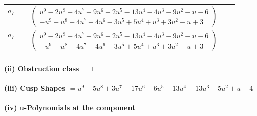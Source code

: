 \documentclass[1p]{elsarticle_modified}
\theoremstyle{definition}
\begin{document}
\begin{tabular}{m{7pt} m{180pt} m{7pt} m{180pt} }
\flushright $a_{7}=$&$\begin{pmatrix}u^9-2 u^8+4 u^7-9 u^6+2 u^5-13 u^4-4 u^3-9 u^2- u-6\\- u^9+u^8-4 u^7+4 u^6-3 u^5+5 u^4+u^3+3 u^2- u+3\end{pmatrix}$\\ \flushright $a_{7}=$&$\begin{pmatrix}u^9-2 u^8+4 u^7-9 u^6+2 u^5-13 u^4-4 u^3-9 u^2- u-6\\- u^9+u^8-4 u^7+4 u^6-3 u^5+5 u^4+u^3+3 u^2- u+3\end{pmatrix}$\\&\end{tabular}
\flushleft \textbf{(ii) Obstruction class $= 1$}\\~\\
\flushleft \textbf{(iii) Cusp Shapes $= u^9-5 u^8+3 u^7-17 u^6-6 u^5-13 u^4-13 u^3-5 u^2+u-4$}\\~\\
\newpage\renewcommand{\arraystretch}{1}
\flushleft \textbf{(iv) u-Polynomials at the component}\newline \\
\end{document}
